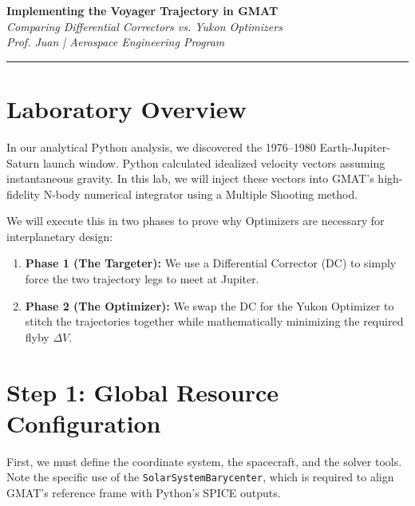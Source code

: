 \documentclass[11pt, letterpaper]{article}
\begin{document}
\begin{center}
    {\Large \textbf{Implementing the Voyager Trajectory in GMAT}} \\
    \vspace{0.2cm}
    {\large \textit{Comparing Differential Correctors vs. Yukon Optimizers}} \\
    \vspace{0.4cm}
    \textit{Prof. Juan | Aerospace Engineering Program}
\end{center}
\hrule
\vspace{0.5cm}

\section*{Laboratory Overview}
In our analytical Python analysis, we discovered the 1976--1980 Earth-Jupiter-Saturn launch window. Python calculated idealized velocity vectors assuming instantaneous gravity. In this lab, we will inject these vectors into GMAT's high-fidelity N-body numerical integrator using a Multiple Shooting method.

We will execute this in two phases to prove why Optimizers are necessary for interplanetary design:
\begin{enumerate}[noitemsep]
    \item \textbf{Phase 1 (The Targeter):} We use a Differential Corrector (DC) to simply force the two trajectory legs to meet at Jupiter. 
    \item \textbf{Phase 2 (The Optimizer):} We swap the DC for the Yukon Optimizer to stitch the trajectories together while mathematically minimizing the required flyby $\Delta V$.
\end{enumerate}

\section*{Step 1: Global Resource Configuration}
First, we must define the coordinate system, the spacecraft, and the solver tools. Note the specific use of the \texttt{SolarSystemBarycenter}, which is required to align GMAT's reference frame with Python's SPICE outputs.
\end{document}
